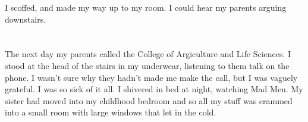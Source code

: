 I scoffed, and made my way up to my room.  I could hear my parents arguing
downstairs.

\section{}

The next day my parents called the College of Argiculture and Life Sciences.  I
stood at the head of the stairs in my underwear, listening to them talk on the
phone.  I wasn't sure why they hadn't made me make the call, but I was vaguely
grateful.  I was so sick of it all.  I shivered in bed at night, watching Mad
Men.  My sister had moved into my childhood bedroom and so all my stuff was
crammed into a small room with large windows that let in the cold.  
